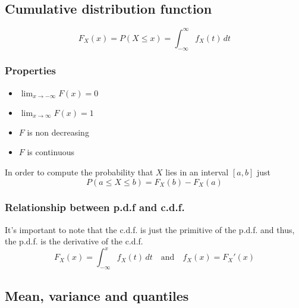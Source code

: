 
\subsection{Cumulative distribution function} %
\label{sub:cumulative_distribution_function}

\begin{equation*}
    F_X(x) = P(X\leq x) = \int_{-\infty}^\infty f_X(t)\,dt
\end{equation*}

\subsubsection{Properties} %
\label{ssub:properties08}

\begin{itemize}
    \item $\lim_{x\rightarrow-\infty}F(x)=0$
    \item $\lim_{x\rightarrow\infty}F(x)=1$
    \item $F$ is non decreasing
    \item $F$ is continuous
\end{itemize}

\begin{tcolorbox}
    In order to compute the probability that $X$ lies in an interval $[a,b]$
    just
    \begin{equation*}
        P(a\leq X\leq b) = F_X(b)-F_X(a)
    \end{equation*}
\end{tcolorbox}

\subsubsection{Relationship between p.d.f and c.d.f.} %
\label{ssub:relationship_between_p_d_f_and_c_d_f_}

It's important to note that the c.d.f. is just the primitive of the p.d.f. and
thus, the p.d.f. is the derivative of the c.d.f.
\begin{equation*}
    F_X(x)=\int_{-\infty}^x f_X(t)\,dt \quad\text{and} \quad f_X(x) = F_X'(x)
\end{equation*}

\subsection{Mean, variance and quantiles} %
\label{sub:mean_variance_and_quantiles}

